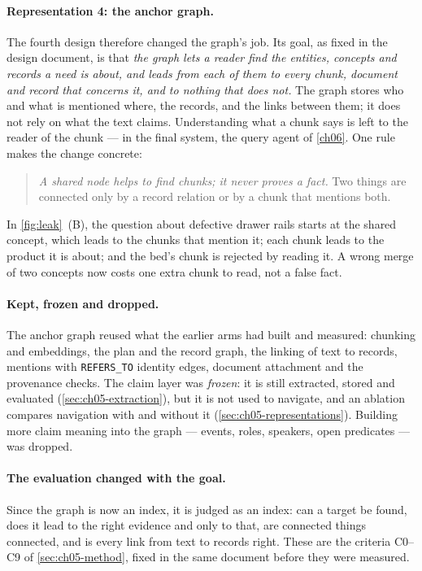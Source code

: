 \paragraph{Representation 4: the anchor graph.} The fourth design therefore changed the graph's job. Its goal, as
fixed in the design document, is that \emph{the graph lets a reader find the entities, concepts and records a need
is about, and leads from each of them to every chunk, document and record that concerns it, and to nothing that
does not.} The graph stores who and what is mentioned where, the records, and the links between them; it does
not rely on what the text claims. Understanding what a chunk says is left to the reader of the chunk --- in the
final system, the query agent of \cref{ch06}. One rule makes the change concrete:

\begin{quote}
\emph{A shared node helps to find chunks; it never proves a fact.} Two things are connected only by a record
relation or by a chunk that mentions both.
\end{quote}

In \cref{fig:leak}~(B), the question about defective drawer rails starts at the shared concept, which leads to the
chunks that mention it; each chunk leads to the product it is about; and the bed's chunk is rejected by reading
it. A wrong merge of two concepts now costs one extra chunk to read, not a false fact.

\paragraph{Kept, frozen and dropped.} The anchor graph reused what the earlier arms had built and measured:
chunking and embeddings, the plan and the record graph, the linking of text to records, mentions with
\texttt{REFERS\_TO} identity edges, document attachment and the provenance checks. The claim layer was
\emph{frozen}: it is still extracted, stored and evaluated (\cref{sec:ch05-extraction}), but it is not used to
navigate, and an ablation compares navigation with and without it (\cref{sec:ch05-representations}). Building
more claim meaning into the graph --- events, roles, speakers, open predicates --- was dropped.

\paragraph{The evaluation changed with the goal.} Since the graph is now an index, it is judged as an index: can a
target be found, does it lead to the right evidence and only to that, are connected things connected, and is every
link from text to records right. These are the criteria C0--C9 of \cref{sec:ch05-method}, fixed in the same
document before they were measured.


